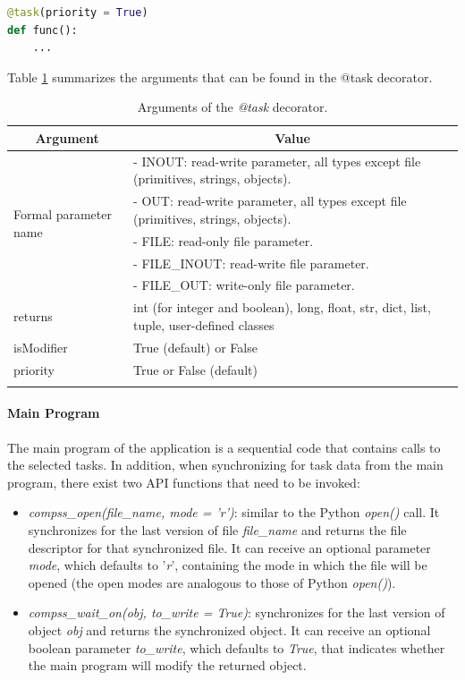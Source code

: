 \begin{lstlisting}[language=python]
@task(priority = True)
def func():
    ...
\end{lstlisting}

Table \ref{tab:task_decorator_arguments} summarizes the arguments that can be found in the @task decorator.

\begin{longtable}{| p{} | p{} |}
\hline
\multicolumn{1}{|c|}{{\bf Argument }}    &  \multicolumn{1}{c|}{{\bf Value }}\\
\hline
\multirow{5}{*}{Formal parameter name}  &  - INOUT: read-write parameter, all types except file (primitives, strings, objects). \\
& - OUT: read-write parameter, all types except file (primitives, strings, objects). \\
& - FILE: read-only file parameter. \\
& - FILE\_INOUT: read-write file parameter. \\
& - FILE\_OUT: write-only file parameter. \\
\hline
returns & int (for integer and boolean), long, float, str, dict, list, tuple, user-defined classes \\
\hline
isModifier &  True (default) or False \\
\hline
priority  & True or False (default) \\
\hline
\caption{Arguments of the {\it @task} decorator.}
\label{tab:task_decorator_arguments}
\end{longtable}


\paragraph{Main Program}
The main program of the application is a sequential code that contains calls to the selected tasks. In addition, when synchronizing for task data from the main program, there exist two API functions that need to be invoked:

\begin{itemize}
 \item {\it compss\_open(file\_name, mode = 'r')}: similar to the Python {\it open()} call. It synchronizes
       for the last version of file {\it file\_name} and returns the file descriptor for that synchronized
       file. It can receive an optional parameter {\it mode}, which defaults to '{\it r}', containing the
       mode in which the file will be opened (the open modes are analogous to those of
       Python {\it open()}).
 \item {\it compss\_wait\_on(obj, to\_write = True)}: synchronizes for the last version of object {\it obj}
       and returns the synchronized object. It can receive an optional boolean parameter
       {\it to\_write}, which defaults to {\it True}, that indicates whether the main program will modify the
       returned object.
\end{itemize}

